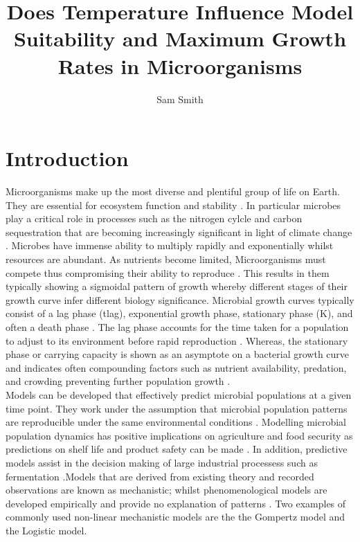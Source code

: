 \documentclass[11pt]{article}
\title{\vspace{+0cm}Does Temperature Influence Model Suitability and Maximum Growth Rates in Microorganisms}
\author{Sam Smith}
\date{}
\begin{document}
  \maketitle
    
  \begin{abstract}
    
  \end{abstract}
  
  \section{Introduction}
  \linenumbers
Microorganisms make up the most diverse and plentiful group of life on Earth. They are essential for ecosystem function and stability \cite{Shoemaker2021}. In particular microbes play a critical role in processes such as the nitrogen cylcle and carbon sequestration that are becoming increasingly significant in light of climate change \cite{Gupta2016}. Microbes have immense ability to multiply rapidly and exponentially whilst resources are abundant. As nutrients become limited, Microorganisms must compete thus compromising their ability to reproduce \cite{NatRevMicro}. This results in them typically showing a sigmoidal pattern of growth whereby different stages of their growth curve infer different biology significance. Microbial growth curves typically consist of a lag phase (tlag), exponential growth phase, stationary phase (K), and often a death phase \cite{Zwietering1990}. The lag phase accounts for the time taken for a population to adjust to its environment before rapid reproduction \cite{BUCHANAN1997313}. Whereas, the stationary phase or carrying capacity is shown as an asymptote on a bacterial growth curve and indicates often compounding factors such as nutrient availability, predation, and crowding preventing further population growth \cite{WACHENHEIM2003157}.\\
     
Models can be developed that effectively predict microbial populations at a given time point. They work under the assumption that microbial population patterns are reproducible under the same environmental conditions \cite{Pla2015}. Modelling microbial population dynamics has positive implications on agriculture and food security as predictions on shelf life and product safety can be made \cite{Zwietering1990}. In addition, predictive models assist in the decision making of large industrial processess such as fermentation \cite{Garcia2021}.Models that are derived from existing theory and recorded observations are known as mechanistic; whilst phenomenological models are developed empirically and provide no explanation of patterns \cite{doi:10.1080/10408398.2011.570463}. Two examples of commonly used non-linear mechanistic models are the the Gompertz model and the Logistic model.\\
\end{document}
